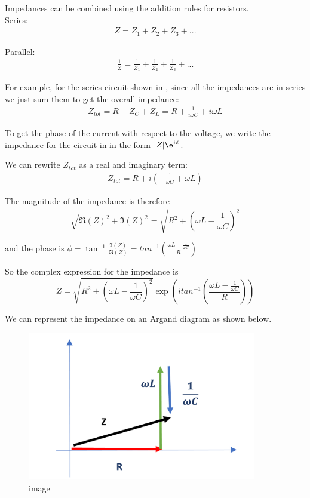 \documentclass[
]{book}
\begin{document}
Impedances can be combined using the addition rules for resistors.\\
Series: \[\begin{aligned}
 Z = Z_1 + Z_2 + Z_3 + ...
\end{aligned}\]

Parallel: \[\begin{aligned}
\frac{1}{Z} = \frac{1}{Z_1} + \frac{1}{Z_2} + \frac{1}{Z_3} + ...
\end{aligned}\]

For example, for the series circuit shown in , since all the impedances
are in series we just sum them to get the overall impedance:
\[\begin{aligned}
Z_{tot} = R + Z_C + Z_L = R + \frac{1}{i\omega C} + i\omega L
\end{aligned}\]

To get the phase of the current with respect to the voltage, we write
the impedance for the circuit in in the form \(|Z| \e^{i\phi}\).

We can rewrite \(Z_{tot}\) as a real and imaginary term: \[\begin{aligned}
Z_{tot} = R + i\left( - \frac{1}{\omega C} + \omega L \right) 
\end{aligned}\]

The magnitude of the impedance is therefore
\[\sqrt{ \Re(Z)^2 + \Im(Z)^2 } = \sqrt{ R^2 + \left( \omega L - \frac{1}{\omega C} \right)^2 }\]

and the phase is
\(\phi = \tan^{-1}⁡ \frac{\Im(Z)}{ \Re(Z)}= tan^{-1}⁡\left( \frac{ \omega L - \frac{1}{\omega C} }{R} \right)\)

So the complex expression for the impedance is
\[Z = \sqrt{ R^2 + \left(\omega L - \frac{1}{\omega C} \right)^2 } \exp⁡ \left( i tan^{-1}⁡ \left( \frac{\omega L - \frac{1}{\omega C} }{R} \right)\right)\]

We can represent the impedance on an Argand diagram as shown below.

\begin{figure}
\centering
\includegraphics[width=100mm,height=\textheight]{Figures/Z_argand.png}
\caption{image}
\end{figure}
\end{document}
